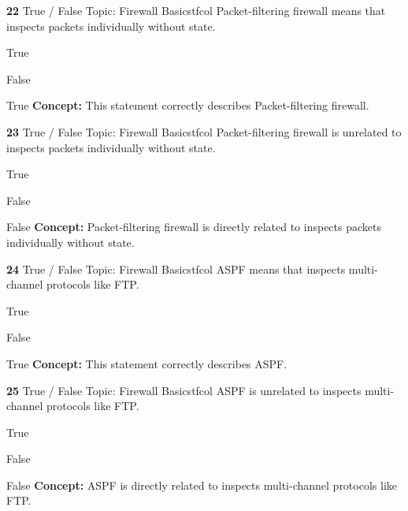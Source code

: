 \documentclass[10pt,a4paper]{article}
\begin{document}
\begin{qcard}{\color{white}\textbf{22} \hfill \small True / False \textbar{} Topic: Firewall Basics}{tfcol}
Packet-filtering firewall means that inspects packets individually without state.

\begin{qoptions}
\item True
\item False
\end{qoptions}
\begin{explainbox}{True}
\textbf{Concept:} This statement correctly describes Packet-filtering firewall.
\end{explainbox}
\end{qcard}

\begin{qcard}{\color{white}\textbf{23} \hfill \small True / False \textbar{} Topic: Firewall Basics}{tfcol}
Packet-filtering firewall is unrelated to inspects packets individually without state.

\begin{qoptions}
\item True
\item False
\end{qoptions}
\begin{explainbox}{False}
\textbf{Concept:} Packet-filtering firewall is directly related to inspects packets individually without state.
\end{explainbox}
\end{qcard}

\begin{qcard}{\color{white}\textbf{24} \hfill \small True / False \textbar{} Topic: Firewall Basics}{tfcol}
ASPF means that inspects multi-channel protocols like FTP.

\begin{qoptions}
\item True
\item False
\end{qoptions}
\begin{explainbox}{True}
\textbf{Concept:} This statement correctly describes ASPF.
\end{explainbox}
\end{qcard}

\begin{qcard}{\color{white}\textbf{25} \hfill \small True / False \textbar{} Topic: Firewall Basics}{tfcol}
ASPF is unrelated to inspects multi-channel protocols like FTP.

\begin{qoptions}
\item True
\item False
\end{qoptions}
\begin{explainbox}{False}
\textbf{Concept:} ASPF is directly related to inspects multi-channel protocols like FTP.
\end{explainbox}
\end{qcard}
\end{document}
